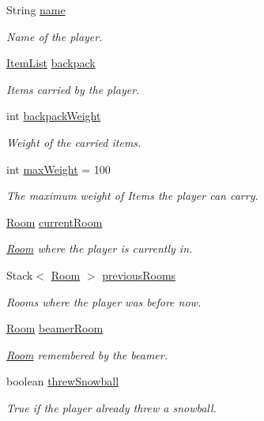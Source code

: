 \begin{DoxyCompactItemize}
\item 
String \hyperlink{classpkg__world_1_1Player_ab4c41ebebb7fcc55fa253e48af0c4267}{name}
\begin{DoxyCompactList}\small\item\em Name of the player. \end{DoxyCompactList}\item 
\hyperlink{classpkg__world_1_1pkg__items_1_1ItemList}{Item\-List} \hyperlink{classpkg__world_1_1Player_adea3925e7f823a9602e5f9ee58683e3b}{backpack}
\begin{DoxyCompactList}\small\item\em Items carried by the player. \end{DoxyCompactList}\item 
int \hyperlink{classpkg__world_1_1Player_a19ed9d4d1b17f409f106142ec2fd68a3}{backpack\-Weight}
\begin{DoxyCompactList}\small\item\em Weight of the carried items. \end{DoxyCompactList}\item 
int \hyperlink{classpkg__world_1_1Player_a780685c88ad92ca6b280cf841ab33728}{max\-Weight} = 100
\begin{DoxyCompactList}\small\item\em The maximum weight of Items the player can carry. \end{DoxyCompactList}\item 
\hyperlink{classpkg__world_1_1Room}{Room} \hyperlink{classpkg__world_1_1Player_a2b0217339fe7077674b0e0a1ad33cc1e}{current\-Room}
\begin{DoxyCompactList}\small\item\em \hyperlink{classpkg__world_1_1Room}{Room} where the player is currently in. \end{DoxyCompactList}\item 
Stack$<$ \hyperlink{classpkg__world_1_1Room}{Room} $>$ \hyperlink{classpkg__world_1_1Player_a28f9bc6a3c1d829996e8a38935b77fd1}{previous\-Rooms}
\begin{DoxyCompactList}\small\item\em Rooms where the player was before now. \end{DoxyCompactList}\item 
\hyperlink{classpkg__world_1_1Room}{Room} \hyperlink{classpkg__world_1_1Player_aadfcdea19eefea1137932f9329c08209}{beamer\-Room}
\begin{DoxyCompactList}\small\item\em \hyperlink{classpkg__world_1_1Room}{Room} remembered by the beamer. \end{DoxyCompactList}\item 
boolean \hyperlink{classpkg__world_1_1Player_ab49e508229cc7834ec48d18c6b61df1a}{threw\-Snowball}
\begin{DoxyCompactList}\small\item\em True if the player already threw a snowball. \end{DoxyCompactList}\end{DoxyCompactItemize}


